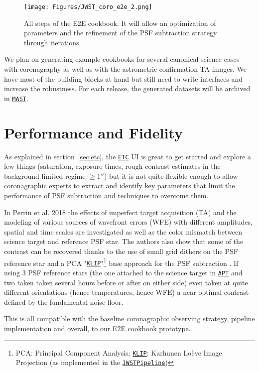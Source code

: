 \documentclass[]{spie}  %
\newcommand{\arcsec}{\mbox{$''$}}
\newcommand{\jwst}{{\tt \href{https://jwst.stsci.edu}{JWST}}\xspace}
\newcommand{\etc}{{\tt \href{https://jwst.etc.stsci.edu/}{ETC}}\xspace}
\newcommand{\apt}{{\tt \href{http://www.stsci.edu/hst/proposing/apt}{APT}}\xspace}
\newcommand{\mast}{{\tt \href{https://archive.stsci.edu}{MAST}}\xspace}
\newcommand{\klip}{{\tt \href{http://jwst-pipeline.readthedocs.io/en/latest/jwst/coron/main.html\#klip}{KLIP}}\xspace}%
\newcommand{\webbpsf}{{\tt \href{https://webbpsf.readthedocs.io/en/stable/}{WebbPSF}}\xspace}%
\newcommand{\pipeline}{{\tt \href{https://jwst-pipeline.readthedocs.io/en/latest/index.html}{Pipeline}}\xspace}
\begin{document}
\begin{figure}[h!]
\begin{center}
\texttt{[image: Figures/JWST\_coro\_e2e\_2.png]}
\caption{All steps of the E2E cookbook.  It will allow an optimization of parameters and the refinement of the PSF subtraction strategy through iterations.}
\label{fig:jwst-e2e}
\end{center}
\end{figure}

We plan on generating example cookbooks for several canonical science cases with coronagraphy as well as with the astrometric confirmation TA images. We have most of the building blocks at hand but still need to write interfaces and increase the robustness. For each release, the generated datasets will be archived in \mast.

\section{Performance and Fidelity}
\label{sec:perf}

As explained in section~\ref{sec:etc}, the \etc UI is great to get started and explore a few things (saturation, exposure times, rough contrast estimates in the background limited regime $\geqslant$1\arcsec) but it is not quite flexible enough to allow coronagraphic experts to extract and identify key parameters that limit the performance of PSF subtraction and techniques to overcome them.

In Perrin et al. 2018\cite{perrin2018_JWST_coro_perfs} the effects of imperfect target acquisition (TA) and the modeling of various sources of wavefront errors (WFE) with different amplitudes, spatial and time scales are investigated as well as the color mismatch between science target and reference PSF star. The authors also show that some of the contrast can be recovered thanks to the use of small grid dithers on the PSF reference star and a PCA "\klip"\footnote{PCA: Principal Component Analysis; \klip: Karhunen
Lo\`eve Image Projection (as implemented in the \jwst \pipeline)} base approach for the PSF subtraction \cite{soummer2012}. If using 3 PSF reference stars (the one attached to the science target in \apt and two taken taken several hours before or after on either side) even taken at quite different orientations (hence temperatures, hence WFE) a near optimal contrast defined by the fundamental noise floor.

 This is all compatible with the baseline coronagraphic observing strategy, pipeline implementation and overall, to our E2E cookbook prototype.
\end{document}
